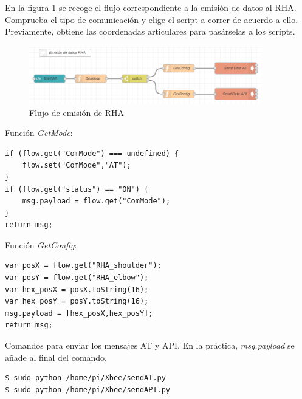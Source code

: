 En la figura \ref{fig:emisionRHA} se recoge el flujo correspondiente a la emisión de datos al RHA. Comprueba el tipo de comunicación y elige el script a correr de acuerdo a ello. Previamente, obtiene las coordenadas articulares para pasárselas a los scripts.

\begin{figure}[H]
\centering
\includegraphics[width=0.9\textwidth]{figuras/emisionFlowRHA.png}
\caption{Flujo de emisión de RHA}
\label{fig:emisionRHA}
\end{figure}

Función \textit{GetMode}:


\begin{lstlisting}[frame=leftline, caption={GetMode}, label=code:GetMode]
if (flow.get("ComMode") === undefined) {
    flow.set("ComMode","AT");
}
if (flow.get("status") == "ON") {
    msg.payload = flow.get("ComMode");
}
return msg;
\end{lstlisting}

Función \textit{GetConfig}:

\begin{lstlisting}[frame=leftline, caption={GetConfig}, label=code:GetConfig]
var posX = flow.get("RHA_shoulder");
var posY = flow.get("RHA_elbow");
var hex_posX = posX.toString(16);
var hex_posY = posY.toString(16);
msg.payload = [hex_posX,hex_posY];
return msg;
\end{lstlisting}

Comandos para enviar los mensajes AT y API. En la práctica, \textit{msg.payload} se añade al final del comando.


\begin{lstlisting}[frame=single, label=command:sendDataRHA]
$ sudo python /home/pi/Xbee/sendAT.py
$ sudo python /home/pi/Xbee/sendAPI.py
\end{lstlisting}

